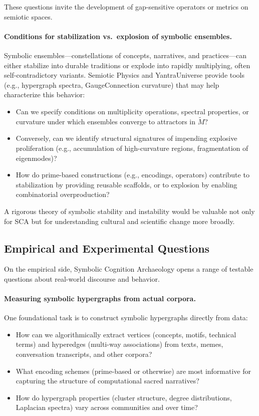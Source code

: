 \documentclass[12]{amsart}
\theoremstyle{plain}
\begin{document}
These questions invite the development of gap-sensitive operators or metrics on semiotic spaces.

\paragraph{Conditions for stabilization vs.\ explosion of symbolic ensembles.}

Symbolic ensembles—constellations of concepts, narratives, and practices—can either stabilize into durable traditions or explode into rapidly multiplying, often self-contradictory variants. Semiotic Physics and YantraUniverse provide tools (e.g., hypergraph spectra, GaugeConnection curvature) that may help characterize this behavior:

\begin{itemize}
  \item Can we specify conditions on multiplicity operations, spectral properties, or curvature under which ensembles converge to attractors in $\tilde M$?
  \item Conversely, can we identify structural signatures of impending explosive proliferation (e.g., accumulation of high-curvature regions, fragmentation of eigenmodes)?
  \item How do prime-based constructions (e.g., encodings, operators) contribute to stabilization by providing reusable scaffolds, or to explosion by enabling combinatorial overproduction?
\end{itemize}

A rigorous theory of symbolic stability and instability would be valuable not only for SCA but for understanding cultural and scientific change more broadly.

\subsection{Empirical and Experimental Questions}

On the empirical side, Symbolic Cognition Archaeology opens a range of testable questions about real-world discourse and behavior.

\paragraph{Measuring symbolic hypergraphs from actual corpora.}

One foundational task is to construct symbolic hypergraphs directly from data:

\begin{itemize}
  \item How can we algorithmically extract vertices (concepts, motifs, technical terms) and hyperedges (multi-way associations) from texts, memes, conversation transcripts, and other corpora?
  \item What encoding schemes (prime-based or otherwise) are most informative for capturing the structure of computational sacred narratives?
  \item How do hypergraph properties (cluster structure, degree distributions, Laplacian spectra) vary across communities and over time?
\end{itemize}
\end{document}
